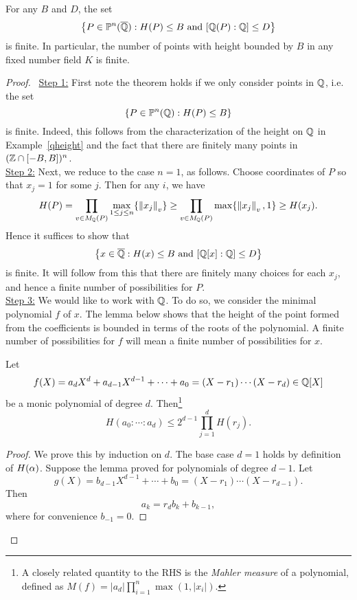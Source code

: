 \begin{thm}\label{height-finite}
For any $B$ and $D$, the set
\[
\left\{{P\in \mathbb{P}^n(\overline{\mathbb{Q}})}:{H(P)\le B\text{ and }[\mathbb{Q}(P):\mathbb{Q}]\le D}\right\}
\]
is finite. In particular, the number of points with height bounded by $B$ in any fixed number field $K$ is finite.
\end{thm}
\begin{proof}$\,$
\noindent\underline{Step 1:} First note the theorem holds if we only consider points in $\mathbb{Q}$, i.e. the set
\[
\left\{{P\in \mathbb{P}^n(\mathbb{Q})}:{H(P)\le B}\right\}
\]
is finite. Indeed, this follows from the characterization of the height on $\mathbb{Q}$ in Example~\ref{qheight} and the fact that there are finitely many points in $(\mathbb{Z}\cap [-B,B])^n$.\\

\noindent\underline{Step 2:}  Next, we reduce to the case $n=1$, as follows. Choose coordinates of $P$ so that $x_j=1$ for some $j$. Then for any $i$, we have
\[
H(P)=\prod_{v\in M_{\mathbb{Q}}(P)} \max_{1\le j\le n}\{\left\Vert {x_j}\right\Vert_v\}
\ge\prod_{v\in M_{\mathbb{Q}}(P)} \max\{\left\Vert {x_j}\right\Vert_v,1\}\ge H(x_j).
\]
Hence it suffices to show that 
\begin{equation}\label{height-finite-p1}
\left\{{x\in \overline{\mathbb{Q}}}:{H(x)\le B\text{ and } [\mathbb{Q}[x]:\mathbb{Q}]\le D}\right\}
\end{equation}
is finite. It will follow from this that there are finitely many choices for each $x_j$, and hence a finite number of possibilities for $P$.\\

\noindent\underline{Step 3:} We would like to work with $\mathbb{Q}$. To do so, we consider the minimal polynomial $f$ of $x$. The lemma below shows that the height of the point formed from the coefficients is bounded in terms of the roots of the polynomial. A finite number of possibilities for $f$ will mean a finite number of possibilities for $x$.
\begin{lem}
Let 
\[f(X)=a_dX^d+a_{d-1}X^{d-1}+\cdots +a_0=(X-r_1)\cdots (X-r_d)\in \mathbb{Q}[X]\]
be a monic polynomial of degree $d$. Then\footnote{A closely related quantity to the RHS is the {\it Mahler measure} of a polynomial, defined as $M(f)=|a_d|\prod_{i=1}^n \max(1,|x_i|)$.}
\[
H(a_0:\cdots :a_d)\le 2^{d-1}\prod_{j=1}^d H(r_j).
\]
\end{lem} 
\begin{proof}
We prove this by induction on $d$. The base case $d=1$ holds by definition of $H(\alpha)$. Suppose the lemma proved for polynomials of degree $d-1$. Let 
\[g(X)=b_{d-1}X^{d-1}+\cdots +b_0=(X-r_1)\cdots (X-r_{d-1}).\]
Then
\[
a_k=r_{d}b_k+b_{k-1},
\]
where for convenience $b_{-1}=0$. 


\end{proof}
\end{proof}
